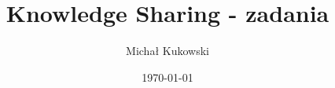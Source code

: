 \documentclass[12]{article}
\title{Knowledge Sharing - zadania}
\author{Michał Kukowski}
\date{\printdayoff\today}
\begin{document}
\def\today{\ifcase\month\or
  Styczeń\or Luty\or Marzec\or Kwiecień\or Maj\or Czerwiec\or
  Lipiec\or Sierpień\or Wrzesień\or Październik\or Listopad\or Grudzień\fi
  \space \number\year}

\maketitle


\clearpage


\clearpage


\end{document}

